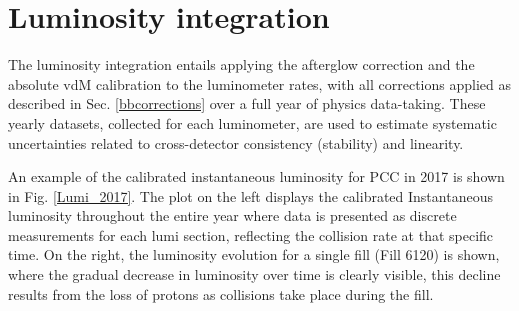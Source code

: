 \section{Luminosity integration}
\label{sec:luminosity_integration_and_uncertainty}

The luminosity integration entails applying the afterglow correction and the absolute vdM calibration to the luminometer rates, with all corrections applied as described in Sec. \ref{bbcorrections} over a full year of physics data-taking. These yearly datasets, collected for each luminometer, are used to estimate systematic uncertainties related to cross-detector consistency (stability) and linearity.

An example of the calibrated instantaneous luminosity for PCC in 2017 is shown in Fig. \ref{Lumi_2017}. The plot on the left displays the calibrated Instantaneous luminosity throughout the entire year where data is presented as discrete measurements for each lumi section, reflecting the collision rate at that specific time. On the right, the luminosity evolution for a single fill (Fill 6120) is shown, where the gradual decrease in luminosity over time is clearly visible, this decline results from the loss of protons as collisions take place during the fill.


